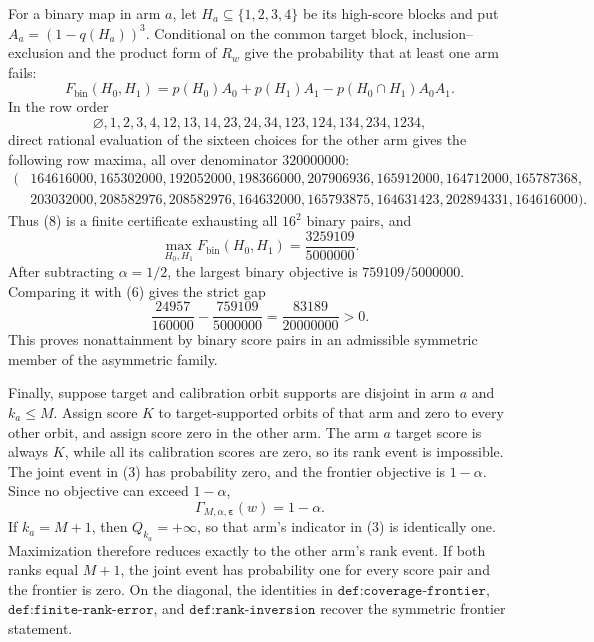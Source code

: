 For a binary map in arm \(a\), let \(H_a\subseteq\{1,2,3,4\}\) be its high-score blocks and put \(A_a=(1-q(H_a))^3\). Conditional on the common target block, inclusion--exclusion and the product form of \(R_w\) give the probability that at least one arm fails:
\[
F_{\mathrm{bin}}(H_0,H_1)=p(H_0)A_0+p(H_1)A_1-p(H_0\cap H_1)A_0A_1.
\tag{7}
\]
In the row order
\[
\varnothing,1,2,3,4,12,13,14,23,24,34,123,124,134,234,1234,
\]
direct rational evaluation of the sixteen choices for the other arm gives the following row maxima, all over denominator \(320000000\):
\[
\begin{split}
(&164616000,165302000,192052000,198366000,207906936,165912000,164712000,165787368,\\
&203032000,208582976,208582976,164632000,165793875,164631423,202894331,164616000).
\end{split}
\tag{8}
\]
Thus (8) is a finite certificate exhausting all \(16^2\) binary pairs, and
\[
\max_{H_0,H_1}F_{\mathrm{bin}}(H_0,H_1)=\frac{3259109}{5000000}.
\]
After subtracting \(\alpha=1/2\), the largest binary objective is \(759109/5000000\). Comparing it with (6) gives the strict gap
\[
\frac{24957}{160000}-\frac{759109}{5000000}=\frac{83189}{20000000}>0.
\tag{9}
\]
This proves nonattainment by binary score pairs in an admissible symmetric member of the asymmetric family.

Finally, suppose target and calibration orbit supports are disjoint in arm \(a\) and \(k_a\le M\). Assign score \(K\) to target-supported orbits of that arm and zero to every other orbit, and assign score zero in the other arm. The arm \(a\) target score is always \(K\), while all its calibration scores are zero, so its rank event is impossible. The joint event in (3) has probability zero, and the frontier objective is \(1-\alpha\). Since no objective can exceed \(1-\alpha\),
\[
\Gamma_{M,\alpha,\boldsymbol\varepsilon}(w)=1-\alpha.
\]
If \(k_a=M+1\), then \(Q_{k_a}=+\infty\), so that arm's indicator in (3) is identically one. Maximization therefore reduces exactly to the other arm's rank event. If both ranks equal \(M+1\), the joint event has probability one for every score pair and the frontier is zero. On the diagonal, the identities in \(\texttt{def:coverage-frontier}\), \(\texttt{def:finite-rank-error}\), and \(\texttt{def:rank-inversion}\) recover the symmetric frontier statement.